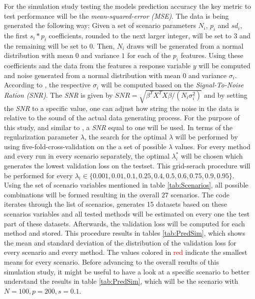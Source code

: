 \documentclass[12pt,a4paper]{article}
\begin{document}
For the simulation study testing the models prediction accuracy the key metric to test performance will be the \textit{mean-squared-error (MSE)}. The data is being generated the following way: Given a set of scenario parameters $N_i$, $p_i$ and $sd_i$, the first $s_i*p_i$ coefficients, rounded to the next larger integer, will be set to $3$ and the remaining will be set to $0$. Then, $N_i$ draws will be generated from a normal distribution with mean $0$ and variance $1$ for each of the $p_i$ features. Using these coefficients and the data from the features a response variable $y$ will be computed and noise generated from a normal distribution with mean $0$ and variance $\sigma_i$. According to \textcite{WangEtAl2020}, the respective $\sigma_i$ will be computed based on the \textit{Signal-To-Noise Ration (SNR)}. The \textit{SNR} is given by $SNR = \sqrt{\beta^TX^TX\beta/(N_i\sigma_i^2)}$ and by setting the \textit{SNR} to a specific value, one can adjust how string the noise in the data is relative to the sound of the actual data generating process. For the purpose of this study, and similar to \textcite{WangEtAl2020}, a \textit{SNR} equal to one will be used. In terms of the regularization parameter $\lambda$, the search for the optimal $\lambda$ will be performed by using five-fold-cross-validation on the a set of possible $\lambda$ values. For every method and every run in every scenario separately, the optimal $\lambda^*_i$ will be chosen which generates the lowest validation loss on the testset. This grid-serach procedure will be performed for every $\lambda_i \in \{0.001, 0.01, 0.1, 0.25, 0.4, 0.5, 0.6, 0.75, 0.9, 0.95\}$.\\

Using the set of scenario variables mentioned in table \ref{tab:Scenarios}, all possible combinations will be formed resulting in the overall $27$ scenarios. The code iterates through the list of scenarios, generates 15 datasets based on these scenarios variables and all tested methods will be estimated on every one the test part of these datasets. Afterwards, the validation loss will be computed for each method and stored. This procedure results in tables \ref{tab:PredSim}, which shows the mean and standard deviation of the distribution of the validation loss for every scenario and every method. The values colored in \textcolor{red}{red} indicate the smallest means for every scenario. Before advancing to the overall results of this simulation study, it might be useful to have a look at a specific scenario to better understand the results in table \ref{tab:PredSim}, which will be the scenario with $N=100, p=200, s=0.1$.\\
\end{document}
